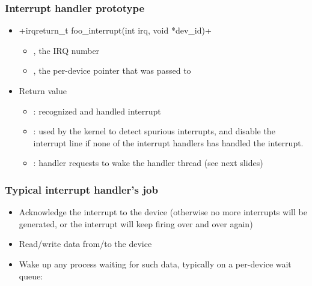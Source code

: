 \begin{frame}[fragile]
  \frametitle{Interrupt handler prototype}
  \begin{itemize}
  \item {}+irqreturn_t foo_interrupt(int irq, void *dev_id)+
    \begin{itemize}
    \item {}, the IRQ number
    \item {}, the per-device pointer that was
      passed to 
    \end{itemize}
  \item Return value
    \begin{itemize}
    \item {}: recognized and handled interrupt
    \item {}: used by the kernel to detect spurious
	interrupts, and disable the interrupt line if none of the
	interrupt handlers has handled the interrupt.
    \item {}: handler requests to wake the
	handler thread (see next slides)
    \end{itemize}
  \end{itemize}
\end{frame}

\begin{frame}
  \frametitle{Typical interrupt handler's job}
  \begin{itemize}
  \item Acknowledge the interrupt to the device (otherwise no more
    interrupts will be generated, or the interrupt will keep firing
    over and over again)
  \item Read/write data from/to the device
  \item Wake up any process waiting for such data, typically on a
    per-device wait queue:\\
\end{itemize}
\end{frame}

